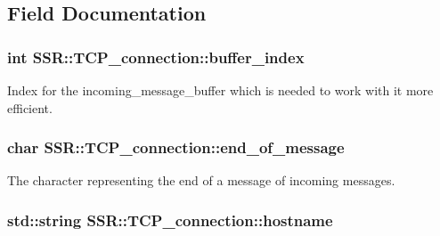 \subsection{Field Documentation}
\hypertarget{classSSR_1_1TCP__connection_a46f58bc3afd2d8f6087a8f5ab69170a5}{
\subsubsection[{buffer\-\_\-index}]{\setlength{\rightskip}{0pt plus 5cm}int S\-S\-R\-::\-T\-C\-P\-\_\-connection\-::buffer\-\_\-index\hspace{0.3cm}{\ttfamily [private]}}}\label{classSSR_1_1TCP__connection_a46f58bc3afd2d8f6087a8f5ab69170a5}
Index for the incoming\-\_\-message\-\_\-buffer which is needed to work with it more efficient. \hypertarget{classSSR_1_1TCP__connection_a375054b2058fea473aeda2df3f2ee8be}{
\subsubsection[{end\-\_\-of\-\_\-message}]{\setlength{\rightskip}{0pt plus 5cm}char S\-S\-R\-::\-T\-C\-P\-\_\-connection\-::end\-\_\-of\-\_\-message\hspace{0.3cm}{\ttfamily [private]}}}\label{classSSR_1_1TCP__connection_a375054b2058fea473aeda2df3f2ee8be}
The character representing the end of a message of incoming messages. \hypertarget{classSSR_1_1TCP__connection_af7f5b7d55ac15ea615354eeb885512e2}{
\subsubsection[{hostname}]{\setlength{\rightskip}{0pt plus 5cm}std\-::string S\-S\-R\-::\-T\-C\-P\-\_\-connection\-::hostname\hspace{0.3cm}{\ttfamily [private]}}}\label{classSSR_1_1TCP__connection_af7f5b7d55ac15ea615354eeb885512e2}
